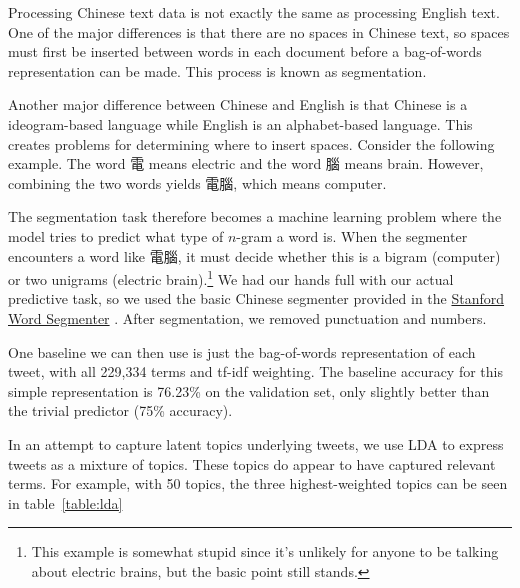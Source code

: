 \documentclass{sig-alternate-05-2015}
\begin{document}
Processing Chinese text data is not exactly the same as processing English text. One of the major differences is that there are no spaces in Chinese text, so spaces must first be inserted between words in each document before a bag-of-words representation can be made. This process is known as segmentation. 

Another major difference between Chinese and English is that Chinese is a ideogram-based language while English is an alphabet-based language. This creates problems for determining where to insert spaces. Consider the following example. The word 電 means electric and the word 腦 means brain. However, combining the two words yields 電腦, which means computer.

The segmentation task therefore becomes a machine learning problem where the model tries to predict what type of $n$-gram a word is. When the segmenter encounters a word like 電腦, it must decide whether this is a bigram (computer) or two unigrams (electric brain).\footnote{This example is somewhat stupid since it's unlikely for anyone to be talking about electric brains, but the basic point still stands.} We had our hands full with our actual predictive task, so we used the basic Chinese segmenter provided in the \href{http://nlp.stanford.edu/software/segmenter.shtml}{Stanford Word Segmenter} \cite{Chang2008}. After segmentation, we removed punctuation and numbers.

One baseline we can then use is just the bag-of-words representation of each tweet, with all 229,334 terms and tf-idf weighting. The baseline accuracy for this simple representation is 76.23\% on the validation set, only slightly better than the trivial predictor (75\% accuracy).

In an attempt to capture latent topics underlying tweets, we use LDA to express tweets as a mixture of topics. These topics do appear to have captured relevant terms. For example, with 50 topics, the three highest-weighted topics can be seen in table~\ref{table:lda}
\end{document}
